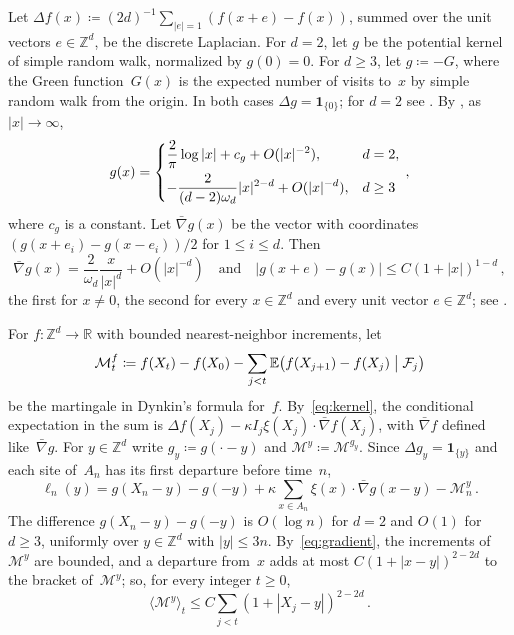 \documentclass[11pt]{amsart}
\theoremstyle{plain}
\theoremstyle{definition}
\newcommand{\Z}{\mathbb Z}
\newcommand{\R}{\mathbb R}
\newcommand{\E}{\mathbb E}
\newcommand{\drift}{\kappa}
\newcommand{\ind}{\mathbf 1}
\numberwithin{equation}{section}
\begin{document}
Let $\Delta f(x)\coloneqq(2d)^{-1}\sum_{|e|=1}(f(x+e)-f(x))$, summed over the unit vectors $e\in\Z^d$, be the discrete Laplacian. For $d=2$, let $g$ be the potential kernel of simple random walk, normalized by $g(0)=0$. For $d\geq3$, let $g\coloneqq-G$, where the Green function~$G(x)$ is the expected number of visits to~$x$ by simple random walk from the origin. In both cases $\Delta g=\ind_{\{0\}}$; for $d=2$ see \citet*[Proposition~4.4.2]{LawlerLimic2010}. By \citet[Theorems~4.3.1 and~4.4.4]{LawlerLimic2010}, as $|x|\to\infty$,
\begin{equation}\label{eq:kernel-asymptotics}
g(x)=\begin{dcases}
\frac2\pi\log|x|+c_g+O(|x|^{-2}),&d=2,\\
-\frac{2}{(d-2)\omega_d}|x|^{2-d}+O(|x|^{-d}),&d\geq3
\end{dcases}\, ,
\end{equation}
where $c_g$ is a constant. Let $\bar\nabla g(x)$ be the vector with coordinates $(g(x+e_i)-g(x-e_i))/2$ for $1\leq i\leq d$. Then
\begin{equation}\label{eq:gradient}
\bar\nabla g(x)=\frac2{\omega_d}\frac{x}{|x|^d}+O(|x|^{-d})
\quad\text{and}\quad
|g(x+e)-g(x)|\leq C(1+|x|)^{1-d}\, ,
\end{equation}
the first for $x\neq0$, the second for every $x\in\Z^d$ and every unit vector $e\in\Z^d$; see \citet[Corollaries~4.3.3 and~4.4.5]{LawlerLimic2010}.

For $f\colon\Z^d\to\R$ with bounded nearest-neighbor increments, let
\begin{equation*}
\mathcal M^f_t\coloneqq f(X_t)-f(X_0)-\sum_{j<t}\E\bigl(f(X_{j+1})-f(X_j)\bigm|\mathcal F_j\bigr)
\end{equation*}
be the martingale in Dynkin's formula for~$f$. By~\eqref{eq:kernel}, the conditional expectation in the sum is $\Delta f(X_j)-\drift I_j\xi(X_j)\cdot\bar\nabla f(X_j)$, with $\bar\nabla f$ defined like~$\bar\nabla g$. For $y\in\Z^d$ write $g_y\coloneqq g(\cdot-y)$ and $\mathcal M^y\coloneqq\mathcal M^{g_y}$. Since $\Delta g_y=\ind_{\{y\}}$ and each site of~$A_n$ has its first departure before time~$n$,
\begin{equation}\label{eq:dynkin}
\ell_n(y)=g(X_n-y)-g(-y)
+\drift\sum_{x\in A_n}\xi(x)\cdot\bar\nabla g(x-y)-\mathcal M_n^y\, .
\end{equation}
The difference $g(X_n-y)-g(-y)$ is $O(\log n)$ for $d=2$ and $O(1)$ for $d\geq3$, uniformly over $y\in\Z^d$ with $|y|\leq3n$. By~\eqref{eq:gradient}, the increments of~$\mathcal M^y$ are bounded, and a departure from~$x$ adds at most $C(1+|x-y|)^{2-2d}$ to the bracket of~$\mathcal M^y$; so, for every integer $t\geq0$,
\begin{equation}\label{eq:bracket}
\langle\mathcal M^y\rangle_t\leq C\sum_{j<t}(1+|X_j-y|)^{2-2d}\, .
\end{equation}
\end{document}
